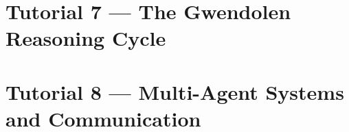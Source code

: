 \section{Tutorial 7 --- The Gwendolen Reasoning Cycle}

{
  \let\section\subsection
  \let\subsection\subsubsection
  \let\subsubsection\paragraph
  
  
  }

\section{Tutorial 8 --- Multi-Agent Systems and Communication}

{
  \let\section\subsection
  \let\subsection\subsubsection
  \let\subsubsection\paragraph
  
  
  }

